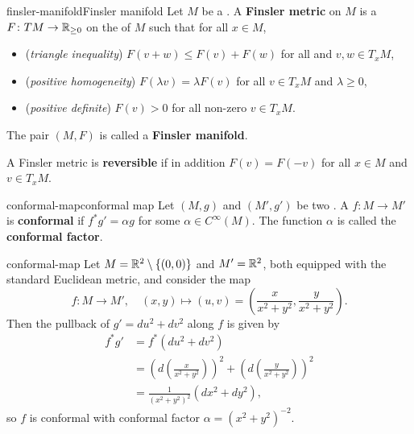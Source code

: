 \begin{topic}{finsler-manifold}{Finsler manifold}
    Let $M$ be a . A \textbf{Finsler metric} on $M$ is a  $F \colon TM \to \mathbb{R}_{\ge 0}$ on the  of $M$ such that for all $x \in M$,
    \begin{itemize}
        \item (\textit{triangle inequality}) $F(v + w) \le F(v) + F(w)$ for all and $v, w \in T_x M$,
        \item (\textit{positive homogeneity}) $F(\lambda v) = \lambda F(v)$ for all $v \in T_x M$ and $\lambda \ge 0$,
        \item (\textit{positive definite}) $F(v) > 0$ for all non-zero $v \in T_x M$.
    \end{itemize}
    The pair $(M, F)$ is called a \textbf{Finsler manifold}.
    
    A Finsler metric is \textbf{reversible} if in addition $F(v) = F(-v)$ for all $x \in M$ and $v \in T_x M$.
\end{topic}

\begin{topic}{conformal-map}{conformal map}
    Let $(M, g)$ and $(M', g')$ be two . A  $f \colon M \to M'$ is \textbf{conformal} if $f^* g' = \alpha g$ for some $\alpha \in C^\infty(M)$. The function $\alpha$ is called the \textbf{conformal factor}.
\end{topic}

\begin{example}{conformal-map}
    Let $M = \mathbb{R}^2 \setminus \{ (0, 0) \}$ and $M' = \mathbb{R}^2$, both equipped with the standard Euclidean metric, and consider the map
    \[ f \colon M \to M', \quad (x, y) \mapsto (u, v) = \left(\frac{x}{x^2 + y^2}, \frac{y}{x^2 + y^2} \right) . \]
    Then the pullback of $g' = du^2 + dv^2$ along $f$ is given by
    \[ \begin{aligned}
        f^* g'
            &= f^* (du^2 + dv^2) \\
            &= \left(d \left(\frac{x}{x^2 + y^2} \right)\right)^2 + \left(d \left( \frac{y}{x^2 + y^2} \right)\right)^2 \\
            &= \frac{1}{(x^2 + y^2)^2} (dx^2 + dy^2) ,
    \end{aligned} \]
    so $f$ is conformal with conformal factor $\alpha = (x^2 + y^2)^{-2}$.
\end{example}

